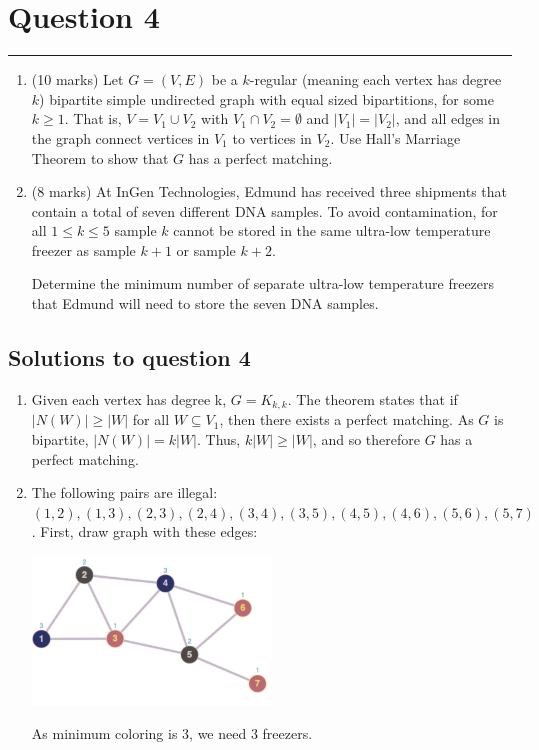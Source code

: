 \documentclass{article}
\begin{document}
\section*{Question 4}
\vspace{0.5cm}\hrule
\vspace{0.5cm}

\begin{enumerate}[label=(\alph*)]
    \item (10 marks) Let $G = (V, E)$ be a $k$-regular (meaning each vertex has degree $k$) bipartite simple undirected graph with equal sized bipartitions, for some $k \geq 1$. That is, $V = V_1 \cup V_2$ with $V_1 \cap V_2 = \emptyset$ and $|V_1| = |V_2|$, and all edges in the graph connect vertices in $V_1$ to vertices in $V_2$. Use Hall’s Marriage Theorem to show that $G$ has a perfect matching.

    \item (8 marks) At InGen Technologies, Edmund has received three shipments that contain a total of seven different DNA samples. To avoid contamination, for all $1 \leq k \leq 5$ sample $k$ cannot be stored in the same ultra-low temperature freezer as sample $k + 1$ or sample $k + 2$.

          Determine the minimum number of separate ultra-low temperature freezers that Edmund will need to store the seven DNA samples.
\end{enumerate}

\subsection*{Solutions to question 4}

\begin{enumerate}[label=(\alph*)]
    \item Given each vertex has degree k, $G=K_{k,k}$. The theorem states that if $|N(W)| \geq |W|$ for all $W \subseteq V_1$, then there exists a perfect matching. As $G$ is bipartite, $|N(W)| = k|W|$. Thus, $k|W| \geq |W|$, and so therefore $G$ has a perfect matching.
    \item The following pairs are illegal: $(1,2), (1,3), (2,3), (2,4), (3,4), (3,5), (4,5), (4,6), (5,6), (5,7)$. First, draw graph with these edges:

          \includegraphics[width=0.5\textwidth]{5-4-b.png}

          As minimum coloring is 3, we need 3 freezers.
\end{enumerate}
\end{document}
